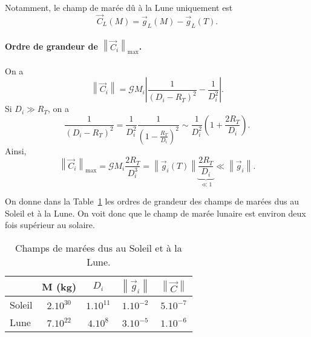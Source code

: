         Notamment, le champ de marée dû à la Lune uniquement est
        \begin{equation}
            \vec{C}_L(M)=\vec{g}_L(M)-\vec{g}_L(T).
        \end{equation}

        \paragraph{Ordre de grandeur de $\left\lVert\vec{C}_i\right\rVert_{\text{max}}$.} 
            On a 
            \begin{equation}
                \left\lVert \vec{C}_i\right\rVert=\mathcal{G}M_i\left\lvert\frac{1}{(D_i-R_T)^{2}}-\frac{1}{D_i^{2}}\right\rvert.
            \end{equation}
            Si $D_i\gg R_T$, on a 
            \begin{equation}
                \frac{1}{(D_i-R_T)^{2}}=\frac{1}{D_i^{2}}\frac{1}{\left(1-\frac{R_T}{D_i}\right)^{2}}\sim\frac{1}{D_i^{2}}\left(1+\frac{2R_T}{D_i}\right).
            \end{equation}
            Ainsi,
            \begin{equation}
                \left\lVert \vec{C}_i\right\rVert_{\text{max}}=\mathcal{G}M_i\frac{2R_T}{D_i^{3}}=\left\lVert\vec{g}_i(T)\right\rVert\underbrace{\frac{2R_T}{D_i}}_{\ll1}\ll\left\lVert \vec{g}_i\right\rVert.
            \end{equation}
            
            On donne dans la Table~\ref{tab:champ_maree_soleil_lune} les ordres de grandeur des champs de marées dus au Soleil et à la Lune. On voit donc que le champ de marée lunaire est environ deux fois supérieur au solaire.
            
            \begin{table}
                \centering
                \begin{tabular}{l|c|c|c|c}
                    \toprule
                    & M (kg) & $D_i$ & $\left\lVert \vec{g}_i\right\rVert$ & $\left\lVert\vec{C}\right\rVert$\\ \midrule
                    Soleil & $2.10^{30}$ & $1.10^{11}$ & $1.10^{-2}$ & $5.10^{-7}$\\ \midrule
                    Lune & $7.10^{22}$ & $4.10^{8}$ & $3.10^{-5}$ & $1.10^{-6}$\\ \bottomrule
                \end{tabular}    
                \caption{Champs de marées dus au Soleil et à la Lune.}
                \label{tab:champ_maree_soleil_lune}
            \end{table}
        
